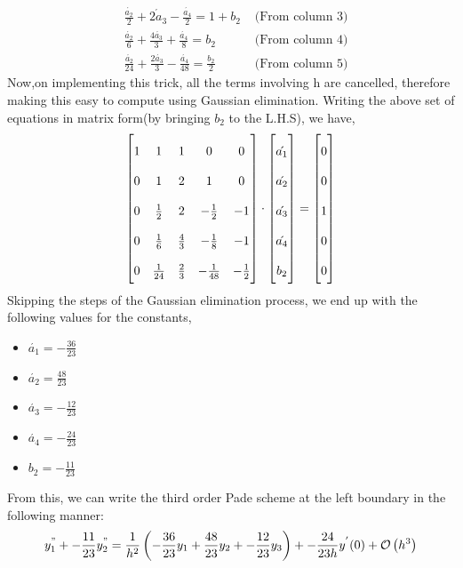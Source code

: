 \documentclass[letterpaper]{exam}
\begin{document}
\begin{questions}
\begin{parts}
\begin{solution}
\begin{align*}
    &\frac{\acute{a_2}}{2} + \acute{2a_3} - \frac{\acute{a_4}}{2}  = 1 +b_2 &\mbox{ (From column 3)}\\
    &\frac{\acute{a_2}}{6} + \frac{4\acute{a_3}}{3} + \frac{\acute{a_4}}{8} = b_2 &\mbox{ (From column 4)}\\
    &\frac{\acute{a_2}}{24} + \frac{2\acute{a_3}}{3} - \frac{\acute{a_4}}{48}= \frac{b_2}{2} &\mbox{ (From column 5)}
\end{align*}
Now,on implementing this trick, all the terms involving h are cancelled, therefore making this easy to compute using Gaussian elimination. Writing the above set of equations in matrix form(by bringing $b_2$ to the L.H.S), we have,
\begin{align*}
\renewcommand{\arraystretch}{2}
    \begin{bmatrix}
    1 & 1 & 1&0&0\\
    0&1&2&1&0\\
    0&\frac{1}{2}&2&-\frac{1}{2}&-1\\
    0&\frac{1}{6}&\frac{4}{3}&-\frac{1}{8}&-1\\
    0&\frac{1}{24}&\frac{2}{3}&-\frac{1}{48}&-\frac{1}{2}\\
    \end{bmatrix} \cdot \begin{bmatrix}
    \acute{a_1}\\
    \acute{a_2}\\
    \acute{a_3}\\
    \acute{a_4}\\
    b_2\\ 
    \end{bmatrix}
     = 
     \begin{bmatrix}
     0\\
     0\\
     1\\
     0\\
     0\\
     \end{bmatrix}
\end{align*}
Skipping the steps of the Gaussian elimination process, we end up with the following values for the constants,
\begin{itemize}
    \item $\acute{a_1} = -\frac{36}{23}$
    \item $\acute{a_2} = \frac{48}{23}$
    \item $\acute{a_3} = -\frac{12}{23}$
    \item $\acute{a_4} = -\frac{24}{23}$
    \item $b_2 = -\frac{11}{23}$
\end{itemize}
From this, we can write the third order Pade scheme at the left boundary in the following manner:
\begin{align}\label{4}
    y_{1}^{"}+ -\frac{11}{23}y_{2}^{"} = \frac{1}{h^2}\left(-\frac{36}{23}y_{1} + \frac{48}{23}y_{2} + -\frac{12}{23}y_{3}\right) + -\frac{24}{23h}y^{'}(0) + \mathcal{O}\left(h^3\right)
\end{align}
\end{solution}
\newpage

\end{parts}
\end{questions}
\end{document}
